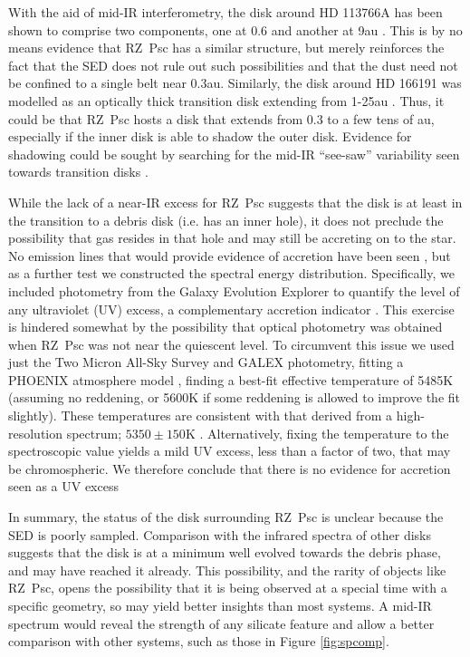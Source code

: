 \documentclass[useAMS,usenatbib,usegraphicx]{mn2e}
\begin{document}
With the aid of mid-IR interferometry, the disk around HD 113766A has been shown to
comprise two components, one at 0.6 and another at 9au \citep{2013A&A...551A.134O}. This
is by no means evidence that RZ~Psc has a similar structure, but merely reinforces the
fact that the SED does not rule out such possibilities and that the dust need not be
confined to a single belt near 0.3au. Similarly, the disk around HD 166191 was modelled
as an optically thick transition disk extending from 1-25au
\citep{2014MNRAS.tmp...88K}. Thus, it could be that RZ~Psc hosts a disk that extends from
0.3 to a few tens of au, especially if the inner disk is able to shadow the outer
disk. Evidence for shadowing could be sought by searching for the mid-IR ``see-saw''
variability seen towards transition disks \citep[e.g.][]{2009ApJ...704L..15M}.

While the lack of a near-IR excess for RZ~Psc suggests that the disk is at least in the
transition to a debris disk (i.e. has an inner hole), it does not preclude the
possibility that gas resides in that hole and may still be accreting on to the star. No
emission lines that would provide evidence of accretion have been seen
\citep{2013Ap.....56..453P,2014A&A...563A.139P}, but as a further test we constructed the
spectral energy distribution. Specifically, we included photometry from the Galaxy
Evolution Explorer \citep[GALEX,][]{2003SPIE.4854..336M} to quantify the level of any
ultraviolet (UV) excess, a complementary accretion indicator
\citep[e.g.][]{1998ApJ...509..802C}. This exercise is hindered somewhat by the
possibility that optical photometry was obtained when RZ~Psc was not near the quiescent
level. To circumvent this issue we used just the Two Micron All-Sky Survey
\citep[2MASS][]{2003tmc..book.....C} and GALEX photometry, fitting a PHOENIX atmosphere
model \citep{2005ESASP.576..565B}, finding a best-fit effective temperature of 5485K
(assuming no reddening, or 5600K if some reddening is allowed to improve the fit
slightly). These temperatures are consistent with that derived from a high-resolution
spectrum; $5350 \pm 150$K \citep{2014A&A...563A.139P}. Alternatively, fixing the
temperature to the spectroscopic value yields a mild UV excess, less than a factor of
two, that may be chromospheric. We therefore conclude that there is no evidence for
accretion seen as a UV excess

In summary, the status of the disk surrounding RZ~Psc is unclear because the SED is
poorly sampled. Comparison with the infrared spectra of other disks suggests that the
disk is at a minimum well evolved towards the debris phase, and may have reached it
already. This possibility, and the rarity of objects like RZ~Psc, opens the possibility
that it is being observed at a special time with a specific geometry, so may yield better
insights than most systems. A mid-IR spectrum would reveal the strength of any silicate
feature and allow a better comparison with other systems, such as those in Figure
\ref{fig:spcomp}.
\end{document}
